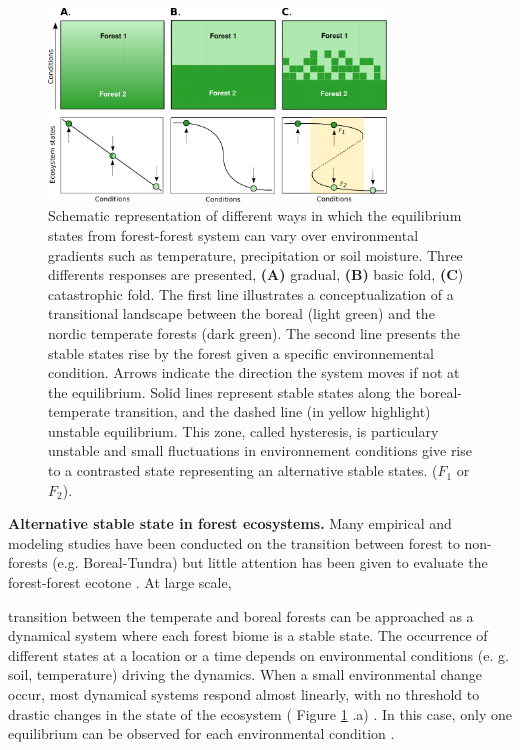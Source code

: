 \begin{figure}[t]
	\begin{center}
	\includegraphics[width=0.8\textwidth]{fig/states.pdf}
	\end{center}
	\caption{Schematic representation of different ways in which the equilibrium
	states from forest-forest system can vary over environmental gradients such as temperature, precipitation
	or soil moisture. Three differents responses are presented,
	\textbf{(A)} gradual, \textbf{(B)} basic fold, \textbf{(C}) catastrophic fold.
	The first line illustrates a conceptualization of a transitional landscape
	between the boreal (light green) and the nordic temperate forests (dark
	green). The second line presents the stable states rise by the forest
	given a specific environnemental condition. Arrows indicate the
	direction the system moves if not at the equilibrium. Solid lines represent stable states along the boreal-temperate
	transition, and the dashed line (in yellow highlight) unstable equilibrium. This zone,
	called hysteresis, is particulary unstable and small fluctuations in
	environnement conditions give rise to a contrasted state representing an
	alternative stable states. ($F_1$ or $F_2$).}
	\label{fig1}
\end{figure}


\textbf{Alternative stable state in forest ecosystems.}  Many empirical  and
modeling studies have been conducted on the transition between forest to non-
forests (e.g. Boreal-Tundra)
\cite{Scheffer2012,Scheffer2001,Hirota2011,Messaoud2007} but little attention
has been given to evaluate the forest-forest ecotone
\cite{Goldblum2010,Graignic2013}. At large scale,


transition between  the temperate and boreal forests can be approached as a
dynamical system where each forest biome is a stable state. The occurrence of
different states at a location or a time depends on environmental conditions
(e. g. soil, temperature) driving the dynamics. When a small environmental
change occur, most dynamical systems respond almost linearly, with no
threshold to drastic changes in the state of the ecosystem ( Figure \ref{fig1}
.a) \cite{Scheffer2001,Scheffer2009}. In this case, only one equilibrium can
be observed for each environmental condition
\cite{Scheffer2001,Scheffer2009,scheffer2009critical}.


